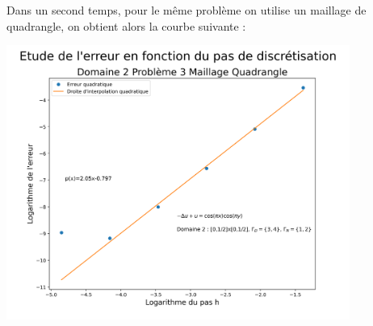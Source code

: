 \documentclass[a4paper, 12pt, french]{report}
\begin{document}
Dans un second temps, pour le même problème on utilise un maillage de quadrangle, on obtient alors la courbe suivante :
\begin{center}
    \includegraphics[height=9cm]{../Images/Courbes_Erreurs/D2P3Q.png}
\end{center}
\end{document}
